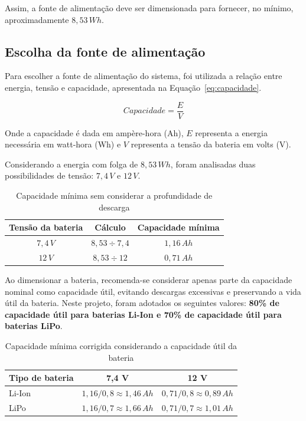 Assim, a fonte de alimentação deve ser dimensionada para fornecer, no mínimo, aproximadamente \textbf{$8{,}53\,Wh$}.

\subsection{Escolha da fonte de alimentação}

Para escolher a fonte de alimentação do sistema, foi utilizada a relação entre energia, tensão e capacidade, apresentada na Equação~\ref{eq:capacidade}.

\begin{equation}
Capacidade = \frac{E}{V}
\label{eq:capacidade}
\end{equation}

Onde a capacidade é dada em ampère-hora (Ah), $E$ representa a energia necessária em watt-hora (Wh) e $V$ representa a tensão da bateria em volts (V).

Considerando a energia com folga de $8{,}53\,Wh$, foram analisadas duas possibilidades de tensão: $7{,}4\,V$ e $12\,V$.

\begin{table}[htbp]
\centering
\caption{Capacidade mínima sem considerar a profundidade de descarga}
\label{tab:capacidade-minima}
\begin{tabular}{|c|c|c|}
\hline
\textbf{Tensão da bateria} & \textbf{Cálculo} & \textbf{Capacidade mínima} \\ \hline
$7{,}4\,V$ & $8{,}53 \div 7{,}4$ & $1{,}16\,Ah$ \\ \hline
$12\,V$ & $8{,}53 \div 12$ & $0{,}71\,Ah$ \\ \hline
\end{tabular}
\end{table}

Ao dimensionar a bateria, recomenda-se considerar apenas parte da capacidade nominal como capacidade útil, evitando descargas excessivas e preservando a vida útil da bateria. Neste projeto, foram adotados os seguintes valores: \textbf{80\% de capacidade útil para baterias Li-Ion e 70\% de capacidade útil para baterias LiPo}.

\begin{table}[htbp]
\centering
\caption{Capacidade mínima corrigida considerando a capacidade útil da bateria}
\label{tab:capacidade-corrigida}
\begin{tabular}{|l|c|c|}
\hline
\textbf{Tipo de bateria} & \textbf{7,4 V} & \textbf{12 V} \\ \hline
Li-Ion & $1{,}16 / 0{,}8 \approx 1{,}46\,Ah$ & $0{,}71 / 0{,}8 \approx 0{,}89\,Ah$ \\ \hline
LiPo & $1{,}16 / 0{,}7 \approx 1{,}66\,Ah$ & $0{,}71 / 0{,}7 \approx 1{,}01\,Ah$ \\ \hline
\end{tabular}
\end{table}

